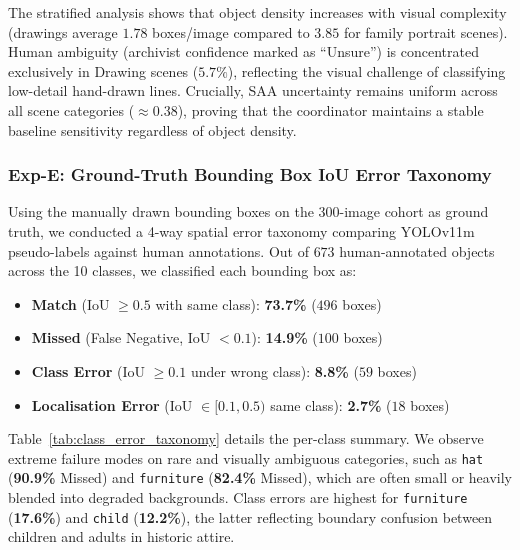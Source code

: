 \documentclass[12pt,onecolumn,a4paper]{IEEEtran}
\begin{document}
The stratified analysis shows that object density increases with visual complexity (drawings average $1.78$ boxes/image compared to $3.85$ for family portrait scenes). Human ambiguity (archivist confidence marked as ``Unsure'') is concentrated exclusively in Drawing scenes ($5.7\%$), reflecting the visual challenge of classifying low-detail hand-drawn lines. Crucially, SAA uncertainty remains uniform across all scene categories ($\approx 0.38$), proving that the coordinator maintains a stable baseline sensitivity regardless of object density.

\subsubsection{Exp-E: Ground-Truth Bounding Box IoU Error Taxonomy}
Using the manually drawn bounding boxes on the 300-image cohort as ground truth, we conducted a 4-way spatial error taxonomy comparing YOLOv11m pseudo-labels against human annotations. Out of $673$ human-annotated objects across the 10 classes, we classified each bounding box as:
\begin{itemize}
    \item \textbf{Match} (IoU $\ge 0.5$ with same class): \textbf{73.7\%} ($496$ boxes)
    \item \textbf{Missed} (False Negative, IoU $< 0.1$): \textbf{14.9\%} ($100$ boxes)
    \item \textbf{Class Error} (IoU $\ge 0.1$ under wrong class): \textbf{8.8\%} ($59$ boxes)
    \item \textbf{Localisation Error} (IoU $\in [0.1, 0.5)$ same class): \textbf{2.7\%} ($18$ boxes)
\end{itemize}

Table~\ref{tab:class_error_taxonomy} details the per-class summary. We observe extreme failure modes on rare and visually ambiguous categories, such as \texttt{hat} (\textbf{90.9\%} Missed) and \texttt{furniture} (\textbf{82.4\%} Missed), which are often small or heavily blended into degraded backgrounds. Class errors are highest for \texttt{furniture} (\textbf{17.6\%}) and \texttt{child} (\textbf{12.2\%}), the latter reflecting boundary confusion between children and adults in historic attire.
\end{document}
